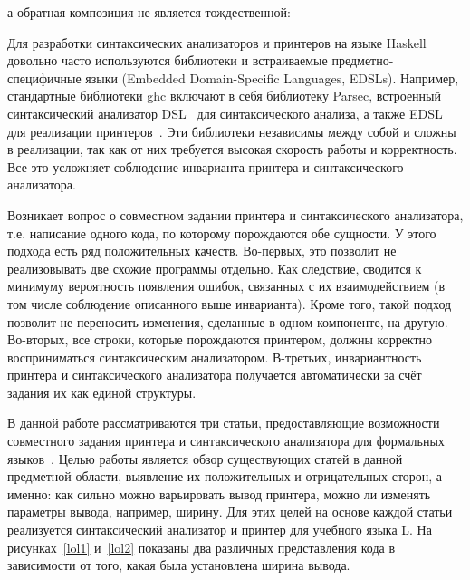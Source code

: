

\noindent а обратная композиция не является тождественной:



Для разработки синтаксических анализаторов и принтеров на языке Haskell довольно часто используются 
библиотеки и встраиваемые предметно-специфичные языки (Embedded Domain-Specific Languages, EDSLs). Например, 
стандартные библиотеки ghc включают в себя библиотеку Parsec, встроенный синтаксический анализатор DSL~\cite{parsec} 
для синтаксического анализа, а также EDSL для реализации принтеров~\cite{Hughes1995}. Эти библиотеки независимы 
между собой и сложны в реализации, так как от них требуется высокая скорость работы и корректность. 
Все это усложняет соблюдение инварианта принтера и синтаксического анализатора.

Возникает вопрос о совместном задании принтера и синтаксического анализатора, т.е. написание одного
кода, по которому порождаются обе сущности. У этого подхода есть ряд 
положительных качеств. Во-первых, это позволит не реализовывать две схожие программы отдельно. 
Как следствие, сводится к минимуму вероятность появления ошибок,
связанных с их взаимодействием (в том числе соблюдение описанного выше инварианта).
Кроме того, 
такой подход позволит не переносить изменения, сделанные в одном компоненте, на другую. Во-вторых, 
все строки, которые порождаются принтером, должны корректно восприниматься синтаксическим анализатором. 
В-третьих, инвариантность принтера и синтаксического анализатора получается автоматически
за счёт задания их как единой структуры.

В данной работе рассматриваются три статьи, предоставляющие возможности совместного задания 
принтера и синтаксического анализатора для формальных языков~\cite{Rendel,Matsuda,Boespflug}.
Целью работы является обзор существующих статей в данной предметной области, выявление их 
положительных и отрицательных сторон, а именно: как сильно можно варьировать вывод принтера, 
можно ли изменять параметры вывода, например, ширину. Для этих целей на основе каждой статьи 
реализуется синтаксический анализатор и принтер для учебного языка L. На рисунках~\ref{lol1} и~\ref{lol2} 
показаны два различных представления кода в зависимости от того, какая была установлена ширина вывода.

